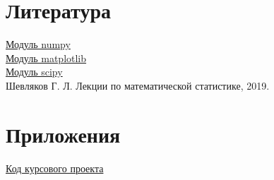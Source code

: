 \documentclass[a4]{article}
\begin{document}
\section{Литература}

\href{https://physics.susu.ru/vorontsov/language/numpy.html}{Модуль numpy}\\

\href{https://matplotlib.org/}{Модуль matplotlib}\\

\href{https://www.scipy.org/}{Модуль scipy}\\

Шевляков Г. Л. Лекции по математической статистике, 2019.


\section{Приложения}

\href{https://github.com/Sergey-Sharapov/MatStat_labs/blob/main/course_project/course_project.py}{Код курсового проекта}
\end{document}
